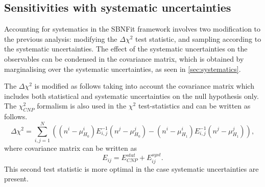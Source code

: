 \subsection{Sensitivities with systematic uncertainties }
\label{subsec:sensitivity_syst_uncertainty}

Accounting for systematics in the SBNFit framework involves two modification to the previous analysis: modifying the $\Delta \chi^2$ test statistic, and sampling according to the systematic uncertainties.
The effect of the systematic uncertainties on the observables can be condensed in the covariance matrix, which is obtained by marginalising over the systematic uncertainties, as seen in \ref{sec:systematics}.

The $\Delta \chi^2$ is modified as follows taking into account the covariance matrix which includes both statistical and systematic uncertainties on the null hypothesis only. The $\chi^2_{CNP}$ formalism is also used in the $\chi^2$ test-statistics and can be written as follows.
\begin{equation}
\label{eqn:deltachi2_systematic}
\Delta\chi^2 = \sum_{i,j=1}^{N}\left( (n^i - \mu^i_{H_0})E_{i,j}^{-1}(n^j - \mu^j_{H_0}) - (n^i - \mu^i_{H_1})E_{i,j}^{-1}(n^j - \mu^j_{H_1})\right) ,
\end{equation}
where covariance matrix can be written as 
\begin{equation}
E_{ij} = E_{CNP}^{stat} + E_{ij}^{syst}.
\end{equation}
This second test statistic is more optimal in the case systematic uncertainties are present.

